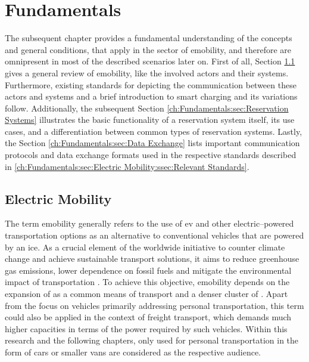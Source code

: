 

\chapter{Fundamentals}
\label{ch:Fundamentals}

The subsequent chapter provides a fundamental understanding of the concepts and general conditions, that apply in the sector of \acrshort{emobility}, and therefore are omnipresent in most of the described scenarios later on.
First of all, Section \ref{ch:Fundamentals:sec:Electric Mobility} gives a general review of \acrshort{emobility}, like the involved actors and their systems. Furthermore, existing standards for depicting the communication between these actors and systems and a brief introduction to smart charging and its variations follow.
Additionally, the subsequent Section \ref{ch:Fundamentals:sec:Reservation Systems} illustrates the basic functionality of a reservation system itself, its use cases, and a differentiation between common types of reservation systems.
Lastly, the Section \ref{ch:Fundamentals:sec:Data Exchange} lists important communication protocols and data exchange formats used in the respective standards described in \ref{ch:Fundamentals:sec:Electric Mobility:ssec:Relevant Standards}.

\section{Electric Mobility}
\label{ch:Fundamentals:sec:Electric Mobility}

The term \acrshort{emobility} generally refers to the use of \acrfull{ev} and other electric--powered transportation options as an alternative to conventional vehicles that are powered by an \acrfull{ice}.
As a crucial element of the worldwide initiative to counter climate change and achieve sustainable transport solutions, it aims to reduce greenhouse gas emissions, lower dependence on fossil fuels and mitigate the environmental impact of transportation \cite{kathiresh_e-mobility_2022}.
To achieve this objective, \acrshort{emobility} depends on the expansion of  as a common means of transport and a denser cluster of .
Apart from the focus on vehicles primarily addressing personal transportation, this term could also be applied in the context of freight transport, which demands much higher capacities in terms of the power required by such vehicles.
Within this research and the following chapters, only  used for personal transportation in the form of cars or smaller vans are considered as the respective audience.

